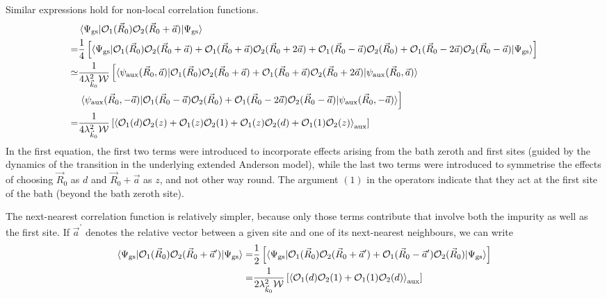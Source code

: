 \documentclass[prb]{revtex4-2}
\begin{document}
Similar expressions hold for non-local correlation functions.
\begin{equation}\begin{aligned}
	\label{nonlocal_correlation}
	&\braket{\Psi_\text{gs} | \mathcal{O}_1(\vec R_0) \mathcal{O}_2(\vec R_0 + \vec a) | \Psi_\text{gs}} \\
	=& \frac{1}{4}\left[\braket{\Psi_\text{gs} | \mathcal{O}_1(\vec R_0) \mathcal{O}_2(\vec R_0 + \vec a) + \mathcal{O}_1(\vec R_0 + \vec a) \mathcal{O}_2(\vec R_0 + 2\vec a) + \mathcal{O}_1(\vec R_0 - \vec a) \mathcal{O}_2(\vec R_0) + \mathcal{O}_1(\vec R_0 - 2\vec a) \mathcal{O}_2(\vec R_0 - \vec a) | \Psi_\text{gs}}\right]\\
	\simeq& \frac{1}{4\lambda_{\vec k_0}^2 \mathcal{W}}\left[\braket{\psi_\text{aux}(\vec R_0, \vec a) | \mathcal{O}_1(\vec R_0) \mathcal{O}_2(\vec R_0 + \vec a) + \mathcal{O}_1(\vec R_0 + \vec a) \mathcal{O}_2(\vec R_0 + 2\vec a) | \psi_\text{aux}(\vec R_0, \vec a)} \right. \\
	      &\left.\braket{\psi_\text{aux}(\vec R_0, -\vec a) | \mathcal{O}_1(\vec R_0 - \vec a) \mathcal{O}_2(\vec R_0) + \mathcal{O}_1(\vec R_0 - 2\vec a) \mathcal{O}_2(\vec R_0 - \vec a) | \psi_\text{aux}(\vec R_0, -\vec a)}\right]\\
	=& \frac{1}{4\lambda_{\vec k_0}^2 \mathcal{W}}\left[\braket{\mathcal{O}_1(d) \mathcal{O}_2(z) + \mathcal{O}_1(z) \mathcal{O}_2(1) + \mathcal{O}_1(z) \mathcal{O}_2(d) + \mathcal{O}_1(1) \mathcal{O}_2(z)}_\text{aux}\right]
\end{aligned}\end{equation}
In the first equation, the first two terms were introduced to incorporate effects arising from the bath zeroth and first sites (guided by the dynamics of the transition in the underlying extended Anderson model), while the last two terms were introduced to symmetrise the effects of choosing \(\vec R_0\) as \(d\) and \(\vec R_0 + \vec a\) as \(z\), and not other way round. The argument \((1)\) in the operators indicate that they act at the first site of the bath (beyond the bath zeroth site).

The next-nearest correlation function is relatively simpler, because only those terms contribute that involve both the impurity as well as the first site. If \(\vec a^\prime\) denotes the relative vector between a given site and one of its next-nearest neighbours, we can write
\begin{equation}\begin{aligned}
	\label{nnn_correlation}
	\braket{\Psi_\text{gs} | \mathcal{O}_1(\vec R_0) \mathcal{O}_2(\vec R_0 + \vec a^\prime) | \Psi_\text{gs}} =& \frac{1}{2}\left[\braket{\Psi_\text{gs} | \mathcal{O}_1(\vec R_0) \mathcal{O}_2(\vec R_0 + \vec a^\prime) + \mathcal{O}_1(\vec R_0 - \vec a^\prime) \mathcal{O}_2(\vec R_0) | \Psi_\text{gs}}\right]\\
	=& \frac{1}{2\lambda_{\vec k_0}^2 \mathcal{W}}\left[\braket{\mathcal{O}_1(d) \mathcal{O}_2(1) + \mathcal{O}_1(1) \mathcal{O}_2(d)}_\text{aux}\right]
\end{aligned}\end{equation}
\end{document}
